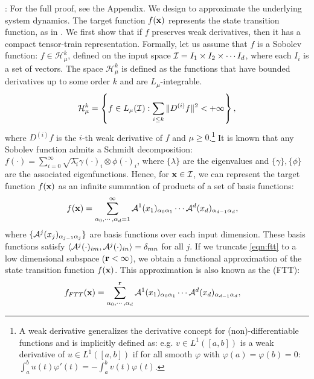 : 
For the full proof, see the Appendix. 
% 
We design \trnn{} to approximate the underlying system dynamics. The target function $f({\mathbf{x}})$ represents the state transition function, as in .
%
We first show that if $f$ preserves weak derivatives, then it has a compact tensor-train representation. Formally, let us assume that $f$ is a Sobolev function: $f\in\mathcal{H}^k_\mu$, defined on the input space ${\mathcal{I}}= I_1 \times I_2\times \cdots I_d $, where each $I_i$ is a set of vectors. The space $\mathcal{H}^k_\mu$ is defined as the functions that have bounded derivatives up to some order $k$ and are $L_\mu$-integrable.
%
\begin{eqnarray}
\mathcal{H}^k_\mu =  \left\{  f  \in L_\mu({\mathcal{I}}):\sum_{i\leq k}\|D^{(i)}f\|^2   < +\infty \right\},
\end{eqnarray}
%
where $D^{(i)}f$ is the $i$-th weak derivative of $f$ and $\mu \geq 0$.\footnote{A weak derivative generalizes the derivative concept for (non)-differentiable functions and is implicitly defined as: e.g. $v\in L^1([a,b])$ is a weak derivative of $u\in L^1([a,b])$ if for all smooth $\varphi$ with $\varphi(a) = \varphi(b) = 0$: $\int_a^bu(t)\varphi'(t) = -\int_a^bv(t)\varphi(t)$.}
% 
It is known that any Sobolev function admits a Schmidt decomposition: $f(\cdot) = \sum_{i =0}^\infty \sqrt{\lambda_i } \gamma (\cdot)_i \otimes \phi (\cdot)_i $, where $\{\lambda \}$ are the eigenvalues and $\{\gamma\}, \{ \phi\}$ are the associated eigenfunctions.
%
Hence, for ${\mathbf{x}}\in\mathcal{I}$, we can represent the target function $f({\mathbf{x}}) $ as an infinite summation of products of a set of basis functions:
%
\begin{align}
&f(\V{x}) = \sum_{\alpha_0,\cdots,\alpha_d=1}^\infty
%
\T{A}^1 (x_1)_{\alpha_0 \alpha_1}
%
\cdots
%
\T{A}^d(x_d)_{\alpha_{d-1}	 \alpha_d},
\label{eqn:ftt}
\end{align}
%
where  $ \{ {\mathcal{A}}^j(x_j)_{\alpha_{j-1} \alpha_j} \}$ are basis functions over each input dimension.
These basis functions satisfy $\langle {\mathcal{A}}^j(\cdot)_{im}, {\mathcal{A}}^j (\cdot)_{in} \rangle = \delta_{mn}$ for all $j$.
% 
If we truncate \eqref{eqn:ftt} to a low dimensional subspace (${\mathbf{r}}<\infty$), we obtain a functional approximation of the state transition function $f({\mathbf{x}})$.  
% 
This approximation is also known as the  (FTT):
%
\begin{align}
&f_{FTT}(\V{x}) = \sum_{\alpha_0,\cdots,\alpha_d}^\mathbf{r}
%
\T{A}^1(x_1)_{\alpha_0\alpha_1}
%
\cdots
%
\T{A}^d(x_d)_{\alpha_{d-1}\alpha_d},
\end{align}

